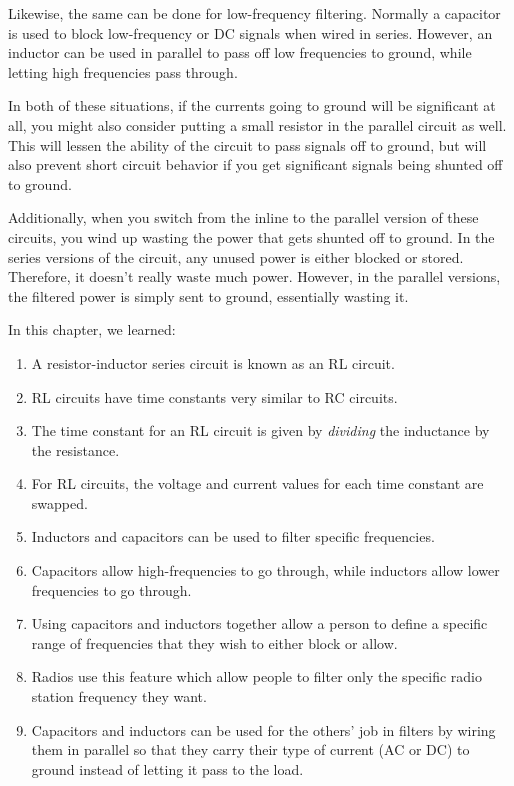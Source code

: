 Likewise, the same can be done for low-frequency filtering.
Normally a capacitor is used to block low-frequency or DC signals when wired in series.
However, an inductor can be used in parallel to pass off low frequencies to ground, while letting high frequencies pass through.

In both of these situations, if the currents going to ground will be significant at all, you might also consider putting a small resistor in the parallel circuit as well. 
This will lessen the ability of the circuit to pass signals off to ground, but will also prevent short circuit behavior if you get significant signals being shunted off to ground.

Additionally, when you switch from the inline to the parallel version of these circuits, you wind up wasting the power that gets shunted off to ground.
In the series versions of the circuit, any unused power is either blocked or stored.
Therefore, it doesn't really waste much power.
However, in the parallel versions, the filtered power is simply sent to ground, essentially wasting it.

\reviewsection

In this chapter, we learned:

\begin{enumerate}
\item A resistor-inductor series circuit is known as an RL circuit.
\item RL circuits have time constants very similar to RC circuits.
\item The time constant for an RL circuit is given by \emph{dividing} the inductance by the resistance.
\item For RL circuits, the voltage and current values for each time constant are swapped.
\item Inductors and capacitors can be used to filter specific frequencies.
\item Capacitors allow high-frequencies to go through, while inductors allow lower frequencies to go through.
\item Using capacitors and inductors together allow a person to define a specific range of frequencies that they wish to either block or allow.
\item Radios use this feature which allow people to filter only the specific radio station frequency they want.
\item Capacitors and inductors can be used for the others' job in filters by wiring them in parallel so that they carry their type of current (AC or DC) to ground instead of letting it pass to the load.
\end{enumerate}

